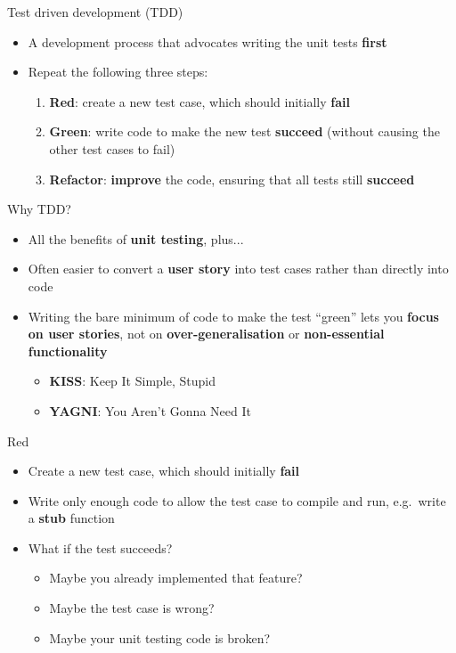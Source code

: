 \begin{frame}{Test driven development (TDD)}
    \begin{itemize}
        \item A development process that advocates writing the unit tests \textbf{first} \pause
        \item Repeat the following three steps: \pause
            \begin{enumerate}
                \item \textbf{Red}: create a new test case, which should initially \textbf{fail} \pause
                \item \textbf{Green}: write code to make the new test \textbf{succeed} (without causing the other test cases to fail) \pause
                \item \textbf{Refactor}: \textbf{improve} the code, ensuring that all tests still \textbf{succeed}
            \end{enumerate}
    \end{itemize}
\end{frame}

\begin{frame}{Why TDD?}
    \begin{itemize}
        \item All the benefits of \textbf{unit testing}, plus... \pause
        \item Often easier to convert a \textbf{user story} into test cases rather than directly into code \pause
        \item Writing the bare minimum of code to make the test ``green''
            lets you \textbf{focus on user stories}, not on \textbf{over-generalisation} or \textbf{non-essential functionality} \pause
            \begin{itemize}
                \item \textbf{KISS}: Keep It Simple, Stupid
                \item \textbf{YAGNI}: You Aren't Gonna Need It
            \end{itemize}
    \end{itemize}
\end{frame}

\begin{frame}{Red}
    \begin{itemize}
        \item Create a new test case, which should initially \textbf{fail} \pause
        \item Write only enough code to allow the test case to compile and run,
            e.g.\ write a \textbf{stub} function \pause
        \item What if the test succeeds? \pause
            \begin{itemize}
                \item Maybe you already implemented that feature? \pause
                \item Maybe the test case is wrong? \pause
                \item Maybe your unit testing code is broken?
            \end{itemize}
    \end{itemize}
\end{frame}

